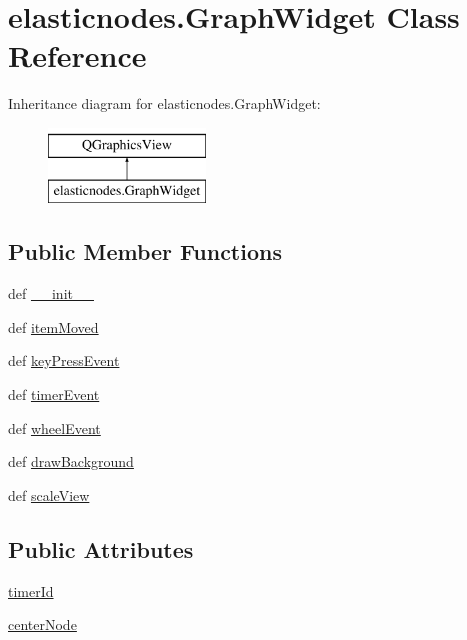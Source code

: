 \hypertarget{classelasticnodes_1_1GraphWidget}{}\section{elasticnodes.\+Graph\+Widget Class Reference}
\label{classelasticnodes_1_1GraphWidget}
Inheritance diagram for elasticnodes.\+Graph\+Widget\+:\begin{figure}[H]
\begin{center}
\leavevmode
\includegraphics[height=2.000000cm]{classelasticnodes_1_1GraphWidget}
\end{center}
\end{figure}
\subsection*{Public Member Functions}
\begin{DoxyCompactItemize}
\item 
def \hyperlink{classelasticnodes_1_1GraphWidget_ab302e74101efe2c4d8474ff29ad6377c}{\+\_\+\+\_\+init\+\_\+\+\_\+}
\item 
def \hyperlink{classelasticnodes_1_1GraphWidget_a5a85f3a18e28ca24a84ace54daf26b4c}{item\+Moved}
\item 
def \hyperlink{classelasticnodes_1_1GraphWidget_aa1a97b98aa84f852ccddb608eba62c26}{key\+Press\+Event}
\item 
def \hyperlink{classelasticnodes_1_1GraphWidget_a92935af74608bfc83a86c04446547b2c}{timer\+Event}
\item 
def \hyperlink{classelasticnodes_1_1GraphWidget_adc4634d300711387aeb0d96d32cee6cc}{wheel\+Event}
\item 
def \hyperlink{classelasticnodes_1_1GraphWidget_aaa43c892902ded2ac72eaffd0d569e9c}{draw\+Background}
\item 
def \hyperlink{classelasticnodes_1_1GraphWidget_abd0f8b4fd663e17c386ca8f52c1c2066}{scale\+View}
\end{DoxyCompactItemize}
\subsection*{Public Attributes}
\begin{DoxyCompactItemize}
\item 
\hyperlink{classelasticnodes_1_1GraphWidget_aca510e4ac31357f361419923fec797ff}{timer\+Id}
\item 
\hyperlink{classelasticnodes_1_1GraphWidget_a77e511d4365d8e6c2c1ae6cc3ef0f8b5}{center\+Node}
\end{DoxyCompactItemize}


